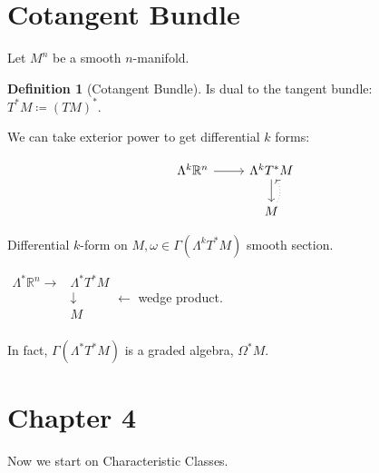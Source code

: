 \documentclass{article}
\theoremstyle{definition}
\newtheorem*{definition}{Definition}
\begin{document}
    \section*{Cotangent Bundle}

    Let \(M^n\) be a smooth \(n\)-manifold.

    \begin{definition}
        [Cotangent Bundle] Is dual to the tangent bundle: \(T^{\ast} M \coloneqq (TM)^{\ast}\).
    \end{definition}

    We can take exterior power to get differential \(k\) forms:

    \[
        \begin{tikzcd}
            \Lambda^k \mathbb{R} ^ n \ar[r] & \Lambda ^k T^{\ast} M \ar[d] \\ & M \ar[u, bend right, dotted]
        \end{tikzcd}
    \]

    Differential \(k\)-form on \(M, \omega \in \Gamma (\Lambda ^ k T^{\ast} M)\) smooth section.

    \(\begin{matrix}
        \Lambda ^{\ast} \mathbb{R}^n \to & \Lambda ^{\ast} T^{\ast} M \\
        & \downarrow \\
        & M \\
    \end{matrix} \leftarrow\) wedge product. 

    In fact, \(\Gamma (\Lambda ^{\ast} T^{\ast} M)\) is a graded algebra, \(\Omega ^{\ast} M\).
    
    \section*{Chapter 4}

    Now we start on Characteristic Classes.
\end{document}

